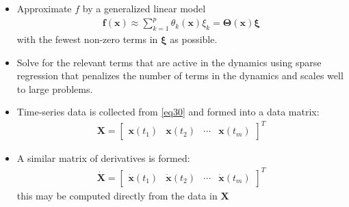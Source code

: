 \documentclass[hyperref={pdfpagemode=FullScreen},aspectratio=169]{beamer}
\begin{document}
\begin{frame}{}
\begin{itemize}
\setlength\itemsep{1em}
\item Approximate $f$ by a generalized linear model
\begin{align}
\mathbf{f}(\mathbf{x}) \approx \sum_{k=1}^{p} \theta_k(\mathbf{x})\xi_k = \mathbf{\Theta}(\mathbf{x})\boldsymbol{\xi}
\end{align}
with the fewest non-zero terms in $\boldsymbol{\xi}$ as possible.
\item Solve for the relevant terms that are active in the dynamics using sparse regression that
penalizes the number of terms in the dynamics and scales well to large problems.
\item Time-series data is collected from \cref{eq30} and formed into a data matrix:
\begin{align}
\mathbf{X} = \begin{bmatrix} \mathbf{x}(t_1) & \mathbf{x}(t_2) & \cdots & \mathbf{x}(t_m) \end{bmatrix}^T
\end{align}
\item A similar matrix of derivatives is formed:
\begin{align}
\dot{\mathbf{X}} = \begin{bmatrix} \dot{\mathbf{x}}(t_1) & \dot{\mathbf{x}}(t_2) & \cdots & \dot{\mathbf{x}}(t_m) \end{bmatrix}^T
\end{align}
 this may be computed directly from the data in $\mathbf{X}$
\end{itemize}
\end{frame}
\end{document}

